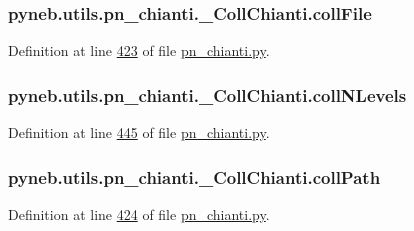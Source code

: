 \subsubsection[{coll\+File}]{\setlength{\rightskip}{0pt plus 5cm}pyneb.\+utils.\+pn\+\_\+chianti.\+\_\+\+Coll\+Chianti.\+coll\+File}\label{classpyneb_1_1utils_1_1pn__chianti_1_1___coll_chianti_aafcdb306ebd11d4b89fd80923a8d69c9}


Definition at line \hyperlink{pn__chianti_8py_source_l00423}{423} of file \hyperlink{pn__chianti_8py_source}{pn\+\_\+chianti.\+py}.

\hypertarget{classpyneb_1_1utils_1_1pn__chianti_1_1___coll_chianti_aca0906388fe4f71d74dfefe17a1d1906}{}
\subsubsection[{coll\+N\+Levels}]{\setlength{\rightskip}{0pt plus 5cm}pyneb.\+utils.\+pn\+\_\+chianti.\+\_\+\+Coll\+Chianti.\+coll\+N\+Levels}\label{classpyneb_1_1utils_1_1pn__chianti_1_1___coll_chianti_aca0906388fe4f71d74dfefe17a1d1906}


Definition at line \hyperlink{pn__chianti_8py_source_l00445}{445} of file \hyperlink{pn__chianti_8py_source}{pn\+\_\+chianti.\+py}.

\hypertarget{classpyneb_1_1utils_1_1pn__chianti_1_1___coll_chianti_af593f39e6cd3d3def54951d5c5f9a400}{}
\subsubsection[{coll\+Path}]{\setlength{\rightskip}{0pt plus 5cm}pyneb.\+utils.\+pn\+\_\+chianti.\+\_\+\+Coll\+Chianti.\+coll\+Path}\label{classpyneb_1_1utils_1_1pn__chianti_1_1___coll_chianti_af593f39e6cd3d3def54951d5c5f9a400}


Definition at line \hyperlink{pn__chianti_8py_source_l00424}{424} of file \hyperlink{pn__chianti_8py_source}{pn\+\_\+chianti.\+py}.

